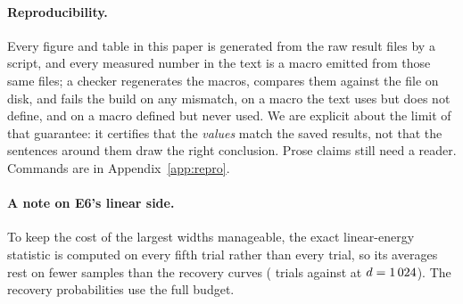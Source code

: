 \paragraph{Reproducibility.} Every figure and table in this paper is generated from the raw
result files by a script, and every measured number in the text is a macro emitted from those
same files; a checker regenerates the macros, compares them against the file on disk, and fails
the build on any mismatch, on a macro the text uses but does not define, and on a macro defined
but never used. We are explicit about the limit of that guarantee: it certifies that the
\emph{values} match the saved results, not that the sentences around them draw the right
conclusion. Prose claims still need a reader. Commands are in Appendix~\ref{app:repro}.

\paragraph{A note on E6's linear side.} To keep the cost of the largest widths manageable, the
exact linear-energy statistic is computed on every fifth trial rather than every trial, so its
averages rest on fewer samples than the recovery curves (\EsixEnergyTrialsTop{} trials against
\EsixOneZeroTwoFourTrials{} at $d=1\,024$). The recovery probabilities use the full budget.

